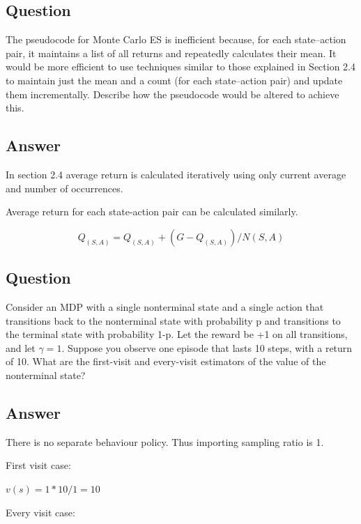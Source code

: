 \documentclass[11pt]{article}
\begin{document}
    \subsection{Question}

    The pseudocode for Monte Carlo ES is inefficient because, for each state–action pair, it maintains a list of all returns and repeatedly calculates their mean.
    It would be more efficient to use techniques similar to those explained in Section 2.4 to maintain just the mean and a count (for each state–action pair) and update them incrementally.
    Describe how the pseudocode would be altered to achieve this.

    \subsection*{Answer}

    In section 2.4 average return is calculated iteratively using only current average and number of occurrences.

    Average return for each state-action pair can be calculated similarly.

    \begin{equation}
        Q_(S,A) = Q_(S,A) + (G - Q_(S,A)) / N(S,A)
    \end{equation}

    \subsection{Question}

    Consider an MDP with a single nonterminal state and a single action that transitions back to the nonterminal state with probability p and transitions to the terminal state with probability 1-p.
    Let the reward be +1 on all transitions, and let $\gamma=1$.
    Suppose you observe one episode that lasts 10 steps, with a return of 10.
    What are the first-visit and every-visit estimators of the value of the nonterminal state?

    \subsection*{Answer}

    There is no separate behaviour policy.
    Thus importing sampling ratio is 1.

    First visit case:

    $ v(s) = 1 * 10 / 1 =  10 $

    Every visit case:
\end{document}
